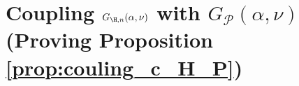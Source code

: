 \section{Coupling {$G_{\H, n}(\alpha, \nu)$} with {$G_{\mathcal{P}}(\alpha,\nu)$} (Proving Proposition \ref{prop:couling_c_H_P})}